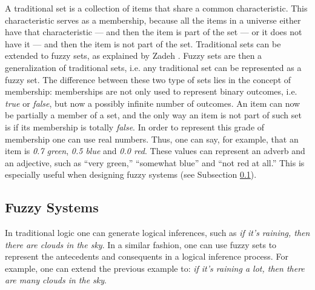 \documentclass[review]{elsarticle}
\begin{document}
A traditional set is a collection of items that share a common
characteristic. This characteristic serves as a membership, because all the
items in a universe either have that characteristic --- and then the item is
part of the set --- or it does not have it --- and then the item is not part of
the set. Traditional sets can be extended to fuzzy sets, as explained by Zadeh
\cite{Zadeh1965}. Fuzzy sets are then a generalization of traditional sets,
i.e. any traditional set can be represented as a fuzzy set. The difference
between these two type of sets lies in the concept of membership: memberships
are not only used to represent binary outcomes, i.e. \textit{true} or
\textit{false}, but now a possibly infinite number of outcomes. An item can now
be partially a member of a set, and the only way an item is not part of such set
is if its membership is totally \textit{false}. In order to represent this grade
of membership one can use real numbers. Thus, one can say, for example, that an
item is \textit{0.7 green}, \textit{0.5 blue} and \textit{0.0 red}. These values
can represent an adverb and an adjective, such as ``very green,'' ``somewhat
blue'' and ``not red at all.'' This is especially useful when designing fuzzy
systems (see Subsection \ref{subsection:fuzzy-systems}).

\subsection{Fuzzy Systems}
\label{subsection:fuzzy-systems}


In traditional logic one can generate logical inferences, such as \textit{if
it's raining, then there are clouds in the sky}. In a similar fashion, one can
use fuzzy sets to represent the antecedents and consequents in a logical
inference process. For example, one can extend the previous example to:
\textit{if it's raining a lot, then there are many clouds in the sky}.
\end{document}
